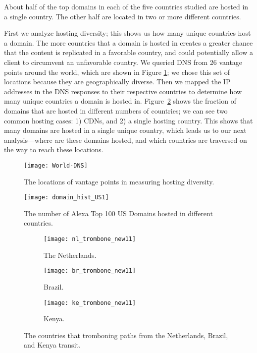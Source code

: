 \begin{finding}
About half of the top domains in each of the five countries studied are hosted in a single country.  The other half are located in two or more different countries.
\end{finding}
\noindent
First we analyze hosting diversity; this shows us how many unique
countries host a domain.  The more countries that a domain is hosted in creates a greater chance that the content is replicated in a favorable country, and could potentially allow a client to circumvent an unfavorable country.  We queried DNS from 26 vantage points around the world, which are shown in Figure \ref{fig:world}; we chose this set of locations because they are geographically diverse.  Then we mapped the IP addresses in the DNS responses to their respective countries to determine how many unique countries a domain is hosted in.  Figure~\ref{fig:host_diversity} shows the fraction of domains that are hosted in different numbers of countries; we can see two common hosting cases: 1) CDNs, and 2) a single hosting country.  This shows that many domains are hosted in a single unique country, which leads us to our next analysis---where are these domains hosted, and which countries are traversed on the way to reach these locations.

\begin{figure}[t]
\centering
\texttt{[image: World-DNS]}
\caption{The locations of vantage points in measuring hosting diversity.}
\label{fig:world}
\end{figure}

\begin{figure}[t]
\centering
\texttt{[image: domain\_hist\_US1]}
\caption{The number of Alexa Top 100 US Domains hosted in different countries.}
\label{fig:host_diversity}
\end{figure}


\begin{figure*}[t!]
\begin{minipage}{\linewidth}
\begin{subfigure}[b]{.32\linewidth}
\texttt{[image: nl\_trombone\_new11]}
\caption{The Netherlands.\label{fig:trombone_netherlands}}
\end{subfigure}
\begin{subfigure}[b]{.32\linewidth}
\texttt{[image: br\_trombone\_new11]}
\caption{Brazil.\label{fig:trombone_brazil}}
\end{subfigure}
\begin{subfigure}[b]{.32\linewidth}
\texttt{[image: ke\_trombone\_new11]}
\caption{Kenya.\label{fig:trombone_kenya}}
\end{subfigure}
\end{minipage}
\caption{The countries that tromboning paths from the Netherlands, Brazil, and Kenya transit.}
\label{fig:trombone}
\end{figure*}



